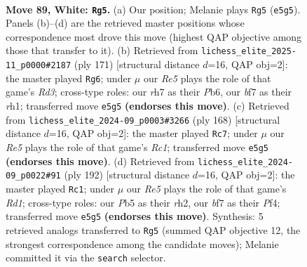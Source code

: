 \documentclass[11pt]{article}
\begin{document}
\clearpage

\begin{figure}[p]\centering
\begin{subfigure}{0.46\textwidth}\centering
\resizebox{\linewidth}{!}{%
\newchessgame
\chessboard[
  setfen={R7/2k2b1r/8/1P2R3/4K3/8/8/8 w - - 5 89},
  showmover=false,
  pgfstyle=straightmove, color=movearrow, markmove={e5-g5}
]}
\caption{}
\end{subfigure}\hfill
\begin{subfigure}{0.46\textwidth}\centering
\resizebox{\linewidth}{!}{%
\newchessgame
\chessboard[
  setfen={8/3k4/1p1r4/3p4/8/2K5/8/7R b - - 29 86},
  showmover=false,
  pgfstyle=straightmove, color=movearrow, markmove={d6-g6}
]}
\caption{}
\end{subfigure}
\\[4pt]
\begin{subfigure}{0.46\textwidth}\centering
\resizebox{\linewidth}{!}{%
\newchessgame
\chessboard[
  setfen={1r6/8/8/8/3k4/3b4/8/2RK4 w - - 68 85},
  showmover=false,
  pgfstyle=straightmove, color=movearrow, markmove={c1-c7}
]}
\caption{}
\end{subfigure}\hfill
\begin{subfigure}{0.46\textwidth}\centering
\resizebox{\linewidth}{!}{%
\newchessgame
\chessboard[
  setfen={4k3/8/8/5p2/5P2/8/7r/3RK3 w - - 62 97},
  showmover=false,
  pgfstyle=straightmove, color=movearrow, markmove={d1-c1}
]}
\caption{}
\end{subfigure}
\caption{\textbf{Move 89, White: \texttt{Rg5}.} (a) Our position; Melanie plays \texttt{Rg5} (\texttt{e5g5}). Panels (b)--(d) are the retrieved master positions whose correspondence most drove this move (highest QAP objective among those that transfer to it). (b) Retrieved from \texttt{lichess\_elite\_2025-11\_p0000\#2187} (ply 171) [structural distance $d$=16, QAP obj=2]: the master played \texttt{Rg6}; under $\mu$ our \emph{Re5} plays the role of that game's \emph{Rd3}; cross-type roles: our \emph{r}h7 as their \emph{P}b6, our \emph{b}f7 as their \emph{r}h1; transferred move \texttt{e5g5} \textbf{(endorses this move)}. (c) Retrieved from \texttt{lichess\_elite\_2024-09\_p0003\#3266} (ply 168) [structural distance $d$=16, QAP obj=2]: the master played \texttt{Rc7}; under $\mu$ our \emph{Re5} plays the role of that game's \emph{Rc1}; transferred move \texttt{e5g5} \textbf{(endorses this move)}. (d) Retrieved from \texttt{lichess\_elite\_2024-09\_p0022\#91} (ply 192) [structural distance $d$=16, QAP obj=2]: the master played \texttt{Rc1}; under $\mu$ our \emph{Re5} plays the role of that game's \emph{Rd1}; cross-type roles: our \emph{P}b5 as their \emph{r}h2, our \emph{b}f7 as their \emph{P}f4; transferred move \texttt{e5g5} \textbf{(endorses this move)}. Synthesis: 5 retrieved analogs transferred to \texttt{Rg5} (summed QAP objective 12, the strongest correspondence among the candidate moves); Melanie committed it via the \texttt{search} selector.}
\label{fig:thought-m176}
\end{figure}
\end{document}
